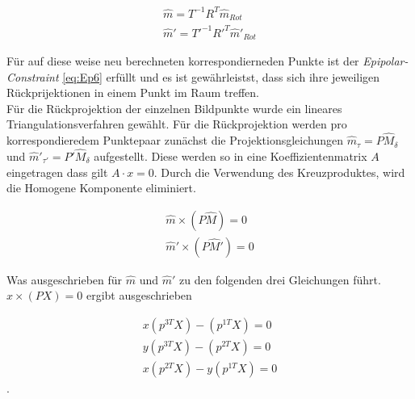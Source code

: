 \begin{gather}
	\hat{m} = T^{-1}R^T\hat{m}_{Rot}\\
	\hat{m}' = T'^{-1}R'^T\hat{m}'_{Rot}
\end{gather}



Für auf diese weise neu berechneten korrespondierneden Punkte ist der \textit{Epipolar-Constraint} \ref{eq:Ep6} erfüllt und es ist gewährleistst, dass sich ihre jeweiligen Rückprijektionen in einem Punkt im Raum treffen.\\

Für die Rückprojektion der einzelnen Bildpunkte wurde ein lineares Triangulationsverfahren gewählt\cite{HZ}. Für die Rückprojektion werden pro korrespondieredem Punktepaar zunächst die Projektionsgleichungen  $\hat{m}_\tau = P\hat{M}_\delta$ und $\hat{m}'_{\tau'}  = P'\hat{M}_\delta$ aufgestellt. Diese werden so in eine Koeffizientenmatrix $A$ eingetragen dass gilt $A\cdot x = 0$. Durch die Verwendung des Kreuzproduktes, wird die Homogene Komponente eliminiert\cite{HZ}. 




\begin{gather}
	\hat{m} \times (P\hat{M}) = 0\\
	\hat{m}' \times (P\hat{M}') = 0
\end{gather}

Was ausgeschrieben für $\hat{m}$ und $\hat{m}'$ zu den folgenden drei Gleichungen führt. $x \times (PX) = 0$ ergibt ausgeschrieben

\begin{gather}
x(p^{3T}X) - (p^{1T}X)=0\\
y(p^{3T}X) - (p^{2T}X)=0\\
x(p^{2T}X) - y(p^{1T}X)=0
\end{gather}
.

